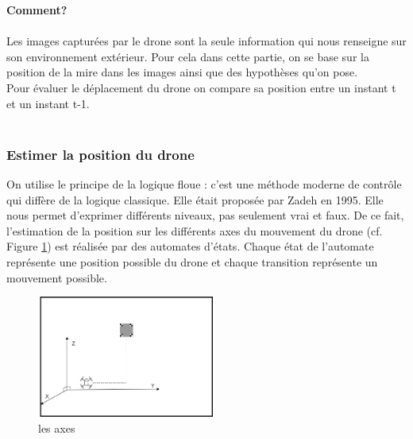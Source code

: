 \documentclass[12pt]{article}
\begin{document}
\textbf{Comment?}\\\\
Les images capturées par le drone sont la seule information qui nous renseigne sur son environnement extérieur. Pour cela dans cette partie, on se base sur la position de la mire dans les images ainsi que des hypothèses qu’on pose. \\
Pour évaluer le déplacement du drone on compare sa position entre un instant t et un instant t-1.\\\\

\subsubsection{Estimer la position du drone}
    On utilise le principe de la logique floue \cite{LaLogiqueFloue} : c’est une méthode moderne de contrôle qui diffère de la logique classique. Elle était proposée par Zadeh en 1995. Elle nous permet d’exprimer différents niveaux, pas seulement vrai et faux.
    De ce fait, l'estimation de la position sur les différents axes du mouvement du drone (cf. Figure \ref{fig:lesAxes}) est réalisée par des automates d'états. Chaque état de l’automate représente une position possible du drone et chaque transition représente un mouvement possible.
    \begin{figure}[H]
            \centering
            \includegraphics[height=4cm]{lesAxes.png}
            \caption{les axes}
            \label{fig:lesAxes}
            \end{figure}
\end{document}
